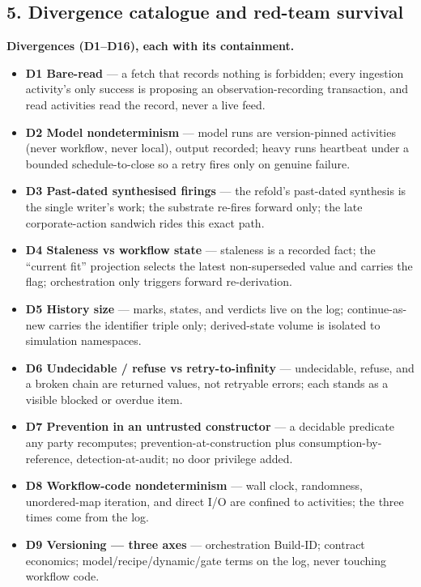 \documentclass[11pt,a4paper]{article}
\begin{document}
\subsection*{5. Divergence catalogue and red-team survival}

\noindent\textbf{Divergences (D1--D16), each with its containment.}

\begin{itemize}[leftmargin=*, itemsep=0pt, topsep=1pt]
\item \textbf{D1 Bare-read} --- a fetch that records nothing is forbidden; every ingestion activity's only
success is proposing an observation-recording transaction, and read activities read the record, never a
live feed.
\item \textbf{D2 Model nondeterminism} --- model runs are version-pinned activities (never workflow, never
local), output recorded; heavy runs heartbeat under a bounded schedule-to-close so a retry fires only on
genuine failure.
\item \textbf{D3 Past-dated synthesised firings} --- the refold's past-dated synthesis is the single
writer's work; the substrate re-fires forward only; the late corporate-action sandwich rides this exact
path.
\item \textbf{D4 Staleness vs workflow state} --- staleness is a recorded fact; the ``current fit''
projection selects the latest non-superseded value and carries the flag; orchestration only triggers
forward re-derivation.
\item \textbf{D5 History size} --- marks, states, and verdicts live on the log; continue-as-new carries the
identifier triple only; derived-state volume is isolated to simulation namespaces.
\item \textbf{D6 Undecidable / refuse vs retry-to-infinity} --- undecidable, refuse, and a broken chain are
returned values, not retryable errors; each stands as a visible blocked or overdue item.
\item \textbf{D7 Prevention in an untrusted constructor} --- a decidable predicate any party recomputes;
prevention-at-construction plus consumption-by-reference, detection-at-audit; no door privilege added.
\item \textbf{D8 Workflow-code nondeterminism} --- wall clock, randomness, unordered-map iteration, and
direct I/O are confined to activities; the three times come from the log.
\item \textbf{D9 Versioning --- three axes} --- orchestration Build-ID; contract economics;
model/recipe/dynamic/gate terms on the log, never touching workflow code.

\end{itemize}
\end{document}
